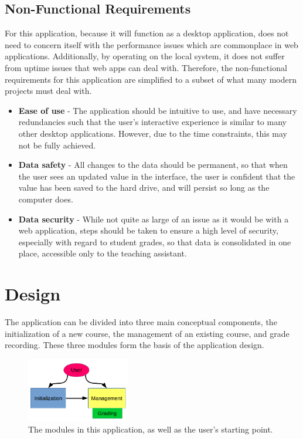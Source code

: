 \documentclass{article}
\begin{document}
	\subsection{Non-Functional Requirements}
		For this application, because it will function as a desktop application, does not need to concern itself with the performance issues which are commonplace in web applications. Additionally, by operating on the local system, it does not suffer from uptime issues that web apps can deal with. Therefore, the non-functional requirements for this application are simplified to a subset of what many modern projects must deal with.
		
		\begin{itemize}
			\item \textbf{Ease of use} - The application should be intuitive to use, and have necessary redundancies such that the user's interactive experience is similar to many other desktop applications. However, due to the time constraints, this may not be fully achieved.
			
			\item \textbf{Data safety} - All changes to the data should be permanent, so that when the user sees an updated value in the interface, the user is confident that the value has been saved to the hard drive, and will persist so long as the computer does.
			
			\item \textbf{Data security} - While not quite as large of an issue as it would be with a web application, steps should be taken to ensure a high level of security, especially with regard to student grades, so that data is consolidated in one place, accessible only to the teaching assistant.
		\end{itemize}

\section{Design}
	The application can be divided into three main conceptual components, the initialization of a new course, the management of an existing course, and grade recording. These three modules form the basis of the application design.
	
	\begin{figure}[h]
		\centering
			\includegraphics[width=0.4\textwidth]{image/modules.png}
			\caption{The modules in this application, as well as the user's starting point.}
	\end{figure}
	
\end{document}
